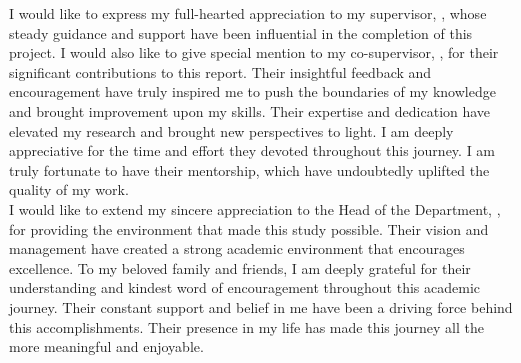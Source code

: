 
I would like to express my full-hearted appreciation to my supervisor, \sup,
whose steady guidance and support have been influential in the completion of
this project. I would also like to give special mention to my co-supervisor,
\cosup, for their significant contributions to this report. Their insightful
feedback and encouragement have truly inspired me to push the boundaries of my
knowledge and brought improvement upon my skills.  Their expertise and
dedication have elevated my research and brought new perspectives to light. I
am deeply appreciative for the time and effort they devoted throughout this
journey. I am truly fortunate to have their mentorship, which have undoubtedly
uplifted the quality of my work.\\


I would like to extend my sincere appreciation to the Head of the Department,
\hod, for providing the environment that made this study possible. Their vision
and management have created a strong academic environment that encourages
excellence. To my beloved family and friends, I am deeply grateful for their
understanding and kindest word of encouragement throughout this academic
journey. Their constant support and belief in me have been a driving force
behind this accomplishments. Their presence in my life has made this journey
all the more meaningful and enjoyable.








